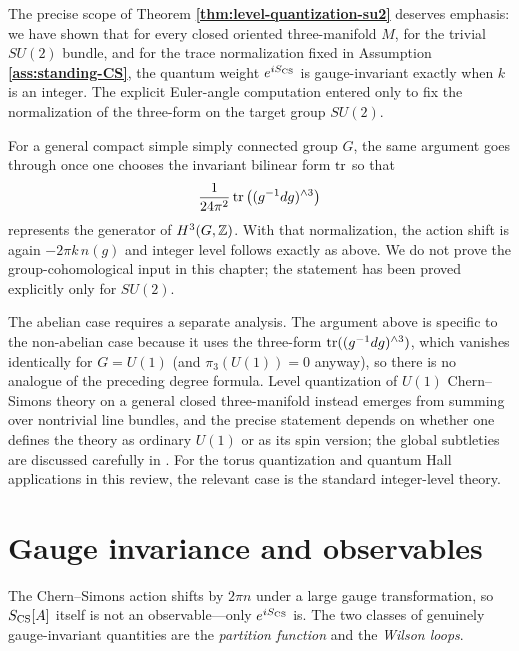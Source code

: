 \noindent The precise scope of Theorem \textbf{\ref{thm:level-quantization-su2}} deserves emphasis: we have shown that for every closed oriented three-manifold $M$, for the trivial $SU(2)$ bundle, and for the trace normalization fixed in Assumption \textbf{\ref{ass:standing-CS}}, the quantum weight $e^{iS_{\operatorname{CS}}}$ is gauge-invariant exactly when $k$ is an integer. The explicit Euler-angle computation entered only to fix the normalization of the three-form on the target group $SU(2)$.

\medskip

\noindent For a general compact simple simply connected group $G$, the same argument goes through once one chooses the invariant bilinear form $\operatorname{tr}$ so that
\begin{equation*}
\frac{1}{24\pi^2}\operatorname{tr}\left((g^{-1}dg)^{\wedge 3}\right)
\end{equation*}
represents the generator of $H^3(G,\mathbb{Z})$. With that normalization, the action shift is again $-2\pi k\, n(g)$ and integer level follows exactly as above. We do not prove the group-cohomological input in this chapter; the statement has been proved explicitly only for $SU(2)$.

\medskip

\noindent The abelian case requires a separate analysis. The argument above is specific to the non-abelian case because it uses the three-form $\operatorname{tr}((g^{-1}dg)^{\wedge 3})$, which vanishes identically for $G=U(1)$ (and $\pi_3(U(1))=0$ anyway), so there is no analogue of the preceding degree formula. Level quantization of $U(1)$ Chern--Simons theory on a general closed three-manifold instead emerges from summing over nontrivial line bundles, and the precise statement depends on whether one defines the theory as ordinary $U(1)$ or as its spin version; the global subtleties are discussed carefully in \cite{SeibergWitten2016Spin}. For the torus quantization and quantum Hall applications in this review, the relevant case is the standard integer-level theory.

\section{Gauge invariance and observables}\label{sec:observables}

The Chern--Simons action shifts by $2\pi n$ under a large gauge transformation, so $S_{\operatorname{CS}}[A]$ itself is not an observable---only $e^{iS_{\operatorname{CS}}}$ is.  The two classes of genuinely gauge-invariant quantities are the \emph{partition function} and the \emph{Wilson loops}.

